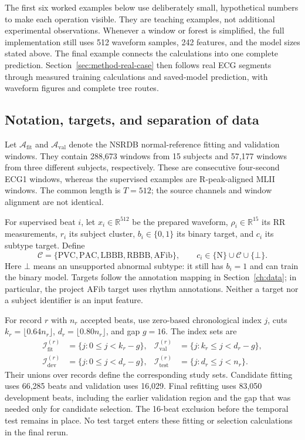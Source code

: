 The first six worked examples below use deliberately small, hypothetical numbers to
make each operation visible. They are teaching examples, not additional
experimental observations. Whenever a window or forest is simplified, the
full implementation still uses 512 waveform samples, 242 features, and the
model sizes stated above. The final example connects the calculations into
one complete prediction. Section~\ref{sec:method-real-case} then follows
real ECG segments through measured training calculations and saved-model
prediction, with waveform figures and complete tree routes.

\subsection{Notation, targets, and separation of data}

Let $\mathcal{A}_{\mathrm{fit}}$ and $\mathcal{A}_{\mathrm{val}}$ denote the
NSRDB normal-reference fitting and validation windows. They contain 288,673
windows from 15 subjects and 57,177 windows from three different subjects,
respectively. These are consecutive four-second ECG1 windows, whereas the
supervised examples are R-peak-aligned MLII windows. The common length is
$T=512$; the source channels and window alignment are not identical.

For supervised beat $i$, let $x_i\in\mathbb{R}^{512}$ be the prepared waveform,
$\rho_i\in\mathbb{R}^{15}$ its RR measurements, $r_i$ its subject cluster,
$b_i\in\{0,1\}$ its binary target, and $c_i$ its subtype target. Define
\begin{equation}
 \mathcal{C}=\{\mathrm{PVC},\mathrm{PAC},\mathrm{LBBB},\mathrm{RBBB},
 \mathrm{AFib}\},\qquad
 c_i\in\{\mathrm{N}\}\cup\mathcal{C}\cup\{\bot\}.
 \label{eq:method-target-sets}
\end{equation}
Here $\bot$ means an unsupported abnormal subtype: it still has $b_i=1$ and
can train the binary model. Targets follow the annotation mapping in
Section~\ref{ch:data}; in particular, the project AFib target uses rhythm
annotations. Neither a target nor a subject identifier is an input feature.

For record $r$ with $n_r$ accepted beats, use zero-based chronological index
$j$, cuts $k_r=\lfloor0.64n_r\rfloor$, $d_r=\lfloor0.80n_r\rfloor$, and
gap $g=16$. The index sets are
\begin{align}
 \mathcal{I}_{\mathrm{fit}}^{(r)}&=\{j:0\leq j<k_r-g\}, &
 \mathcal{I}_{\mathrm{val}}^{(r)}&=\{j:k_r\leq j<d_r-g\},\\
 \mathcal{I}_{\mathrm{dev}}^{(r)}&=\{j:0\leq j<d_r-g\}, &
 \mathcal{I}_{\mathrm{test}}^{(r)}&=\{j:d_r\leq j<n_r\}.
 \label{eq:method-training-index-sets}
\end{align}
Their unions over records define the corresponding study sets. Candidate
fitting uses 66,285 beats and validation uses 16,029. Final refitting uses
83,050 development beats, including the earlier validation region and the
gap that was needed only for candidate selection. The 16-beat exclusion
before the temporal test remains in place. No test target enters these
fitting or selection calculations in the final rerun.

